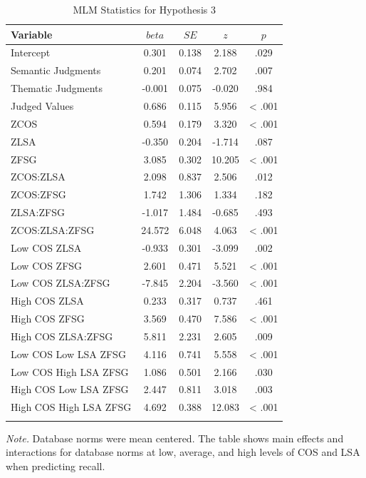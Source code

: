 \documentclass[english,man]{apa6}
\theoremstyle{definition}
\theoremstyle{definition}
\theoremstyle{definition}
\theoremstyle{remark}
\begin{document}
\begin{table}[tbp]
\begin{center}
\begin{threeparttable}
\caption{\label{tab:hyp3-table}MLM Statistics for Hypothesis 3}
\small{
\begin{tabular}{lcccc}
\toprule
Variable & \multicolumn{1}{c}{$beta$} & \multicolumn{1}{c}{$SE$} & \multicolumn{1}{c}{$z$} & \multicolumn{1}{c}{$p$}\\
\midrule
Intercept & 0.301 & 0.138 & 2.188 & .029\\
Semantic Judgments & 0.201 & 0.074 & 2.702 & .007\\
Thematic Judgments & -0.001 & 0.075 & -0.020 & .984\\
Judged Values & 0.686 & 0.115 & 5.956 & < .001\\
ZCOS & 0.594 & 0.179 & 3.320 & < .001\\
ZLSA & -0.350 & 0.204 & -1.714 & .087\\
ZFSG & 3.085 & 0.302 & 10.205 & < .001\\
ZCOS:ZLSA & 2.098 & 0.837 & 2.506 & .012\\
ZCOS:ZFSG & 1.742 & 1.306 & 1.334 & .182\\
ZLSA:ZFSG & -1.017 & 1.484 & -0.685 & .493\\
ZCOS:ZLSA:ZFSG & 24.572 & 6.048 & 4.063 & < .001\\
Low COS ZLSA & -0.933 & 0.301 & -3.099 & .002\\
Low COS ZFSG & 2.601 & 0.471 & 5.521 & < .001\\
Low COS ZLSA:ZFSG & -7.845 & 2.204 & -3.560 & < .001\\
High COS ZLSA & 0.233 & 0.317 & 0.737 & .461\\
High COS ZFSG & 3.569 & 0.470 & 7.586 & < .001\\
High COS ZLSA:ZFSG & 5.811 & 2.231 & 2.605 & .009\\
Low COS Low LSA ZFSG & 4.116 & 0.741 & 5.558 & < .001\\
Low COS High LSA ZFSG & 1.086 & 0.501 & 2.166 & .030\\
High COS Low LSA ZFSG & 2.447 & 0.811 & 3.018 & .003\\
High COS High LSA ZFSG & 4.692 & 0.388 & 12.083 & < .001\\
\bottomrule
\addlinespace
\end{tabular}
}
\begin{tablenotes}[para]
\textit{Note.} Database norms were mean centered. The table shows main effects and interactions for database norms at low, average, and high levels of COS and LSA when predicting recall.
\end{tablenotes}
\end{threeparttable}
\end{center}
\end{table}
\end{document}
